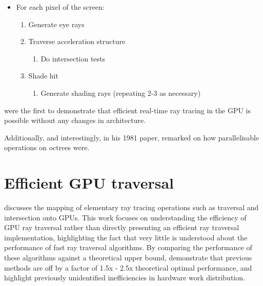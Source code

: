 \let\oldlabelitemi\labelitemi
\renewcommand{\labelitemi}{}

\begin{itemize}
	\item For each pixel of the screen:

	\begin{enumerate}
		\item Generate eye rays
		\item Traverse acceleration structure

			\begin{enumerate}
				\item Do intersection tests
			\end{enumerate}

		\item Shade hit

			\begin{enumerate}
				\item Generate shading rays (repeating 2-3 as necessary)
			\end{enumerate}

	\end{enumerate}
\end{itemize}

\citeauthor{purcell02gpuraytracing} were the first to demonstrate that efficient real-time ray tracing in the GPU is possible without any changes in architecture.

Additionally, and interestingly, in his 1981 paper, \citeauthor{meagher81octree} remarked on how parallelisable operations on octrees were.

\let\labelitemi\oldlabelitemi

\section{Efficient GPU traversal}
\cite{aila2009hpg} discusses the mapping of elementary ray tracing operations such as traversal and intersection onto GPUs. This work focuses on understanding the efficiency of GPU ray traversal rather than directly presenting an efficient ray traversal implementation, highlighting the fact that very little is understood about the performance of fast ray traversal algorithms. By comparing the performance of these algorithms against a theoretical upper bound, \citeauthor{aila2009hpg} demonstrate that previous methods are off by a factor of 1.5x - 2.5x theoretical optimal performance, and highlight previously unidentified inefficiencies in hardware work distribution.

